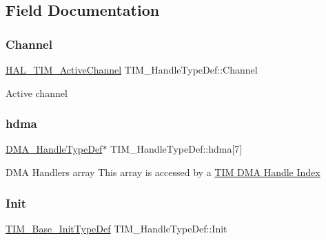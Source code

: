 \subsection{Field Documentation}
\mbox{\label{struct_t_i_m___handle_type_def_ae9c5a11c1f5b27c808c0aca453e63870}} 
\subsubsection{\texorpdfstring{Channel}{Channel}}
{\footnotesize\ttfamily \hyperlink{group___t_i_m___exported___types_gaa3fa7bcbb4707f1151ccfc90a8cf9706}{H\+A\+L\+\_\+\+T\+I\+M\+\_\+\+Active\+Channel} T\+I\+M\+\_\+\+Handle\+Type\+Def\+::\+Channel}

Active channel \mbox{\label{struct_t_i_m___handle_type_def_a15338c71de82fa178c685be868e694bd}} 
\subsubsection{\texorpdfstring{hdma}{hdma}}
{\footnotesize\ttfamily \hyperlink{group___d_m_a___exported___types_ga41b754a906b86bce54dc79938970138b}{D\+M\+A\+\_\+\+Handle\+Type\+Def}$\ast$ T\+I\+M\+\_\+\+Handle\+Type\+Def\+::hdma\mbox{[}7\mbox{]}}

D\+MA Handlers array This array is accessed by a \hyperlink{group___d_m_a___handle__index}{T\+IM D\+MA Handle Index} \mbox{\label{struct_t_i_m___handle_type_def_a8b2e61c3c4128e62cb7be7d35048152e}} 
\subsubsection{\texorpdfstring{Init}{Init}}
{\footnotesize\ttfamily \hyperlink{struct_t_i_m___base___init_type_def}{T\+I\+M\+\_\+\+Base\+\_\+\+Init\+Type\+Def} T\+I\+M\+\_\+\+Handle\+Type\+Def\+::\+Init}

